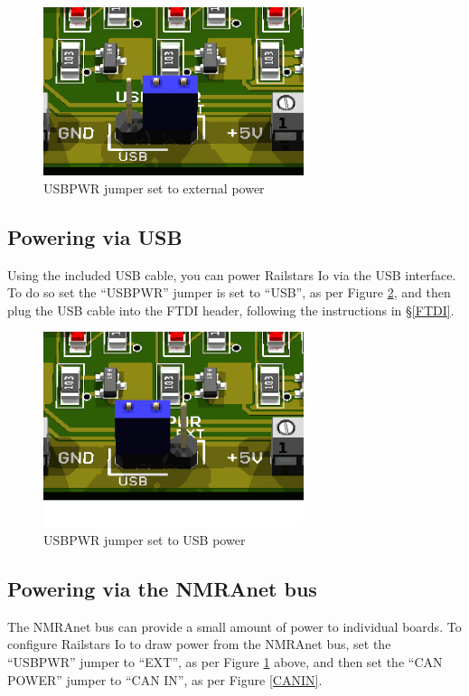 \documentclass[12pt]{book}
\begin{document}
\begin{figure}[htbp]
\begin{center}
\includegraphics[width=3in]{images/IoUSBPowerEXT.png}
\caption{USBPWR jumper set to external power}
\label{EXTPWR}
\end{center}
\end{figure}

\subsection{Powering via USB}

Using the included USB cable, you can power Railstars Io via the USB interface. To do so set the ``USBPWR'' jumper is set to ``USB'', as per Figure \ref{USBPWR}, and then plug the USB cable into the FTDI header, following the instructions in \S\ref{FTDI}.

\begin{figure}[htbp]
\begin{center}
\includegraphics[width=3in]{images/IoUSBPowerUSB.png}
\caption{USBPWR jumper set to USB power}
\label{USBPWR}
\end{center}
\end{figure}

\subsection{Powering via the NMRAnet bus}

The NMRAnet bus can provide a small amount of power to individual boards. To configure Railstars Io to draw power from the NMRAnet bus, set the ``USBPWR'' jumper to ``EXT'', as per Figure \ref{EXTPWR} above, and then set the ``CAN POWER'' jumper to ``CAN IN'', as per Figure \ref{CANIN}.
\end{document}

